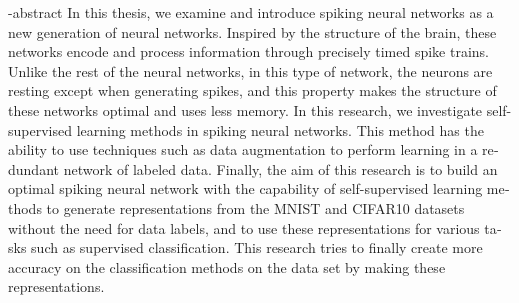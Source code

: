 \baselineskip=0.6cm
\begin{latin}
\en-abstract{\noindent 
In this thesis, we examine and introduce spiking neural networks as a new generation of neural networks. Inspired by the structure of the brain, these networks encode and process information through precisely timed spike trains. Unlike the rest of the neural networks, in this type of network, the neurons are resting except when generating spikes, and this property makes the structure of these networks optimal and uses less memory.
In this research, we investigate self-supervised learning methods in spiking neural networks. This method has the ability to use techniques such as data augmentation to perform learning in a redundant network of labeled data.
Finally, the aim of this research is to build an optimal spiking neural network with the capability of self-supervised learning methods to generate representations from the MNIST and CIFAR10 datasets without the need for data labels, and to use these representations for various tasks such as supervised classification. This research tries to finally create more accuracy on the classification methods on the data set by making these representations.
}
\latinvtitle
\end{latin}